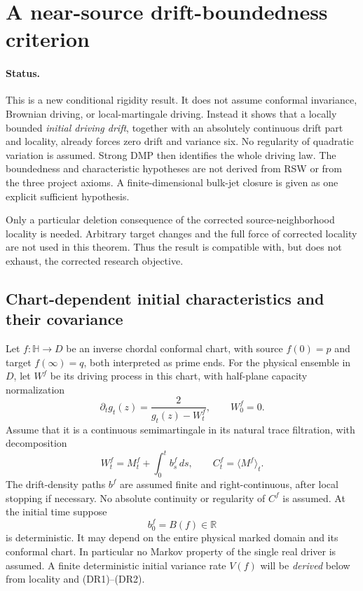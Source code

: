 \documentclass[11pt]{article}
\theoremstyle{definition}\newtheorem{definition}[theorem]{Definition}
\theoremstyle{remark}\newtheorem{remark}[theorem]{Remark}
\begin{document}
\section{A near-source drift-boundedness criterion}
\label{sec:strong-local-loewner}

\paragraph{Status.}
This is a new conditional rigidity result.  It does not assume conformal
invariance, Brownian driving, or local-martingale driving.  Instead it shows
that a locally bounded \emph{initial driving drift}, together with an
absolutely continuous drift part and locality, already forces zero drift and
variance six.  No regularity of quadratic variation is assumed.  Strong DMP then identifies the whole driving law.  The
boundedness and characteristic hypotheses are not derived from RSW or from
the three project axioms.  A finite-dimensional bulk-jet closure is given as
one explicit sufficient hypothesis.

Only a particular deletion consequence of the corrected source-neighborhood
locality is needed.  Arbitrary target changes and the full force of corrected
locality are not used in this theorem.  Thus the result is compatible with,
but does not exhaust, the corrected research objective.

\subsection{Chart-dependent initial characteristics and their covariance}

Let $f:\mathbb H\to D$ be an inverse chordal conformal chart, with source
$f(0)=p$ and target $f(\infty)=q$, both interpreted as prime ends.
For the physical ensemble in $D$, let $W^f$ be its driving process in this
chart, with half-plane capacity normalization
\[
 \partial_t g_t(z)=\frac{2}{g_t(z)-W^f_t},\qquad W^f_0=0.
\]
Assume that it is a continuous semimartingale in its natural trace filtration,
with decomposition
\[
 W^f_t=M^f_t+\int_0^t b^f_s\,ds,\qquad
 C^f_t=\langle M^f\rangle_t.
 \tag{DR1}
\]
The drift-density paths $b^f$ are assumed finite and right-continuous,
after local stopping if necessary.  No absolute continuity or regularity
of $C^f$ is assumed.  At the initial time suppose
\[
 b^f_0=B(f)\in\mathbb R
 \tag{DR2}
\]
is deterministic.  It may depend on the entire physical marked domain and
its conformal chart.  In particular no Markov property of the single real
driver is assumed.  A finite deterministic initial variance rate $V(f)$
will be \emph{derived} below from locality and (DR1)--(DR2).
\end{document}
